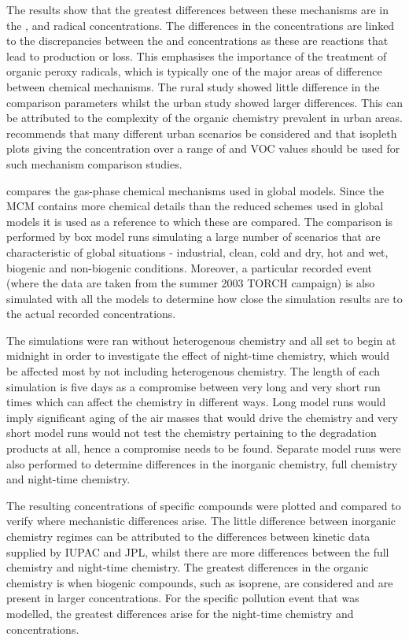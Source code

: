 The results show that the greatest differences between these mechanisms are in the ,  and  radical 
concentrations. The differences in the  concentrations are linked to the discrepancies between the  and  
concentrations as these are reactions that lead to  production or loss. This emphasises the importance of the treatment
of organic peroxy radicals, which is typically one of the major areas of difference between chemical mechanisms. The rural study
showed little difference in the comparison parameters whilst the urban study showed larger differences. This can be attributed 
to the complexity of the organic chemistry prevalent in urban areas. \citep{Gross:2003} recommends that many different urban 
scenarios be considered and that  isopleth plots giving the  concentration over a range of  and VOC 
values should be used for such mechanism comparison studies. 

\citep{Emmerson:2009} compares the gas-phase chemical mechanisms used in global models. Since the MCM contains more chemical 
details than the reduced schemes used in global models it is used as a reference to which these are compared. The comparison is 
performed by box model runs simulating a large number of scenarios that are characteristic of global situations - industrial, 
clean, cold and dry, hot and wet, biogenic and non-biogenic conditions. Moreover, a particular recorded event (where the data 
are taken from the summer 2003 TORCH campaign) is also simulated with all the models to determine how close the simulation 
results are to the actual recorded concentrations. 

The simulations were ran without heterogenous chemistry and all set to begin at midnight in order to investigate the effect of 
night-time chemistry, which would be affected most by not including heterogenous chemistry. The length of each simulation is 
five days as a compromise between very long and very short run times which can affect the chemistry in different ways. Long 
model runs would imply significant aging of the air masses that would drive the chemistry and very short model runs would not 
test the chemistry pertaining to the degradation products at all, hence a compromise needs to be found. Separate model runs were
also performed to determine differences in the inorganic chemistry, full chemistry and night-time chemistry.

The resulting concentrations of specific compounds were plotted and compared to verify where mechanistic differences arise. The 
little difference between inorganic chemistry regimes can be attributed to the differences between kinetic data supplied by 
IUPAC and JPL, whilst there are more differences between the full chemistry and night-time chemistry. The greatest differences 
in the organic chemistry is when biogenic compounds, such as isoprene, are considered and are present in larger concentrations. 
For the specific pollution event that was modelled, the greatest differences arise for the night-time chemistry and  
concentrations.

